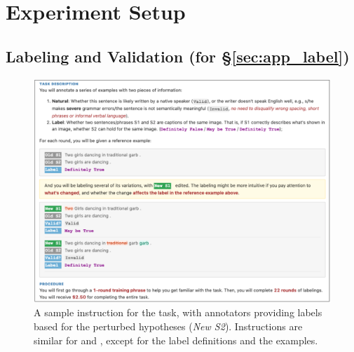 \section{Experiment Setup}
\label{appendix:instruct}

\subsection{Labeling and Validation (for \S\ref{sec:app_label})}
\label{appendix:label_instruct}

\begin{figure}
\centering
\includegraphics[width=1\textwidth]{figures/mturk_instruction.pdf}
\vspace{-15pt}
\caption{A sample instruction for the \nli task, with annotators providing labels based for the perturbed hypotheses (\emph{New S2}). Instructions are similar for \qqp and \sst, except for the label definitions and the examples. }
\vspace{-10pt}
\label{fig:mturk_instruction_detail}
\end{figure}

